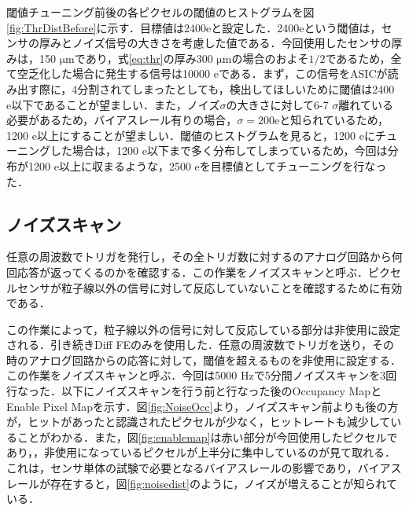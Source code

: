 閾値チューニング前後の各ピクセルの閾値のヒストグラムを図\ref{fig:ThrDistBefore}に示す．目標値は2400$\mathrm{e}$と設定した．2400$\mathrm{e}$という閾値は，センサの厚みとノイズ信号の大きさを考慮した値である．今回使用したセンサの厚みは，150 $\mathrm{\mu m}$であり，式\ref{eq:thr}の厚み300 $\mathrm{\mu m}$の場合のおよそ$1/2$であるため，全て空乏化した場合に発生する信号は10000 $\mathrm{e}$である．まず，この信号をASICが読み出す際に，4分割されてしまったとしても，検出してほしいために閾値は2400 $\mathrm{e}$以下であることが望ましい．また，ノイズ$\sigma$の大きさに対して6-7 $\sigma$離れている必要があるため，バイアスレール有りの場合，$\sigma = 200 \mathrm{e}$と知られているため，1200 $\mathrm{e}$以上にすることが望ましい．閾値のヒストグラムを見ると，1200 $\mathrm{e}$にチューニングした場合は，1200 $\mathrm{e}$以下まで多く分布してしまっているため，今回は分布が1200 $\mathrm{e}$以上に収まるような，2500 $\mathrm{e}$を目標値としてチューニングを行なった．

\subsection{ノイズスキャン}
任意の周波数でトリガを発行し，その全トリガ数に対するのアナログ回路から何回応答が返ってくるのかを確認する．この作業をノイズスキャンと呼ぶ．ピクセルセンサが粒子線以外の信号に対して反応していないことを確認するために有効である．\par
この作業によって，粒子線以外の信号に対して反応している部分は非使用に設定される．引き続きDiff FEのみを使用した．任意の周波数でトリガを送り，その時のアナログ回路からの応答に対して，閾値を超えるものを非使用に設定する．この作業をノイズスキャンと呼ぶ．今回は5000 $\mathrm{Hz}$で5分間ノイズスキャンを3回行なった．以下にノイズスキャンを行う前と行なった後のOccupancy MapとEnable Pixel Mapを示す．図\ref{fig:NoiseOcc}より，ノイズスキャン前よりも後の方が，ヒットがあったと認識されたピクセルが少なく，ヒットレートも減少していることがわかる．また，図\ref{fig:enablemap}は赤い部分が今回使用したピクセルであり，，非使用になっているピクセルが上半分に集中しているのが見て取れる．これは，センサ単体の試験で必要となるバイアスレールの影響であり，バイアスレールが存在すると，図\ref{fig:noisedist}のように，ノイズが増えることが知られている．

